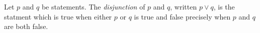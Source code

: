 \guard





\begin{defn}
\label{defn:disjunctionOfStatement}
  Let $p$ and $q$ be statements.
  The \emph{disjunction} of $p$ and $q$, written $p \vee q$, is the statment which is true when either $p$ or $q$ is true and false precisely when $p$ and $q$ are both false.
\end{defn}
